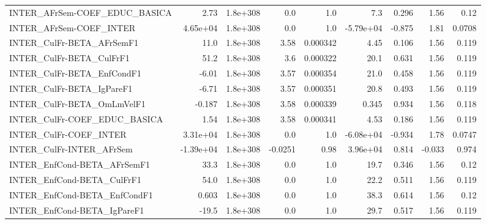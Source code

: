 \begin{tabular}{lrrrrrrrr}
INTER\_AFrSem-COEF\_EDUC\_BASICA         &        2.73 &     1.8e+308 &     0.0 &      1.0 &        7.3 &       0.296 &         1.56 &          0.12 \\
INTER\_AFrSem-COEF\_INTER               &    4.65e+04 &     1.8e+308 &     0.0 &      1.0 &  -5.79e+04 &      -0.875 &         1.81 &        0.0708 \\
INTER\_CulFr-BETA\_AFrSemF1             &        11.0 &     1.8e+308 &    3.58 & 0.000342 &       4.45 &       0.106 &         1.56 &         0.119 \\
INTER\_CulFr-BETA\_CulFrF1              &        51.2 &     1.8e+308 &     3.6 & 0.000322 &       20.1 &       0.631 &         1.56 &         0.119 \\
INTER\_CulFr-BETA\_EnfCondF1            &       -6.01 &     1.8e+308 &    3.57 & 0.000354 &       21.0 &       0.458 &         1.56 &         0.119 \\
INTER\_CulFr-BETA\_IgPareF1             &       -6.71 &     1.8e+308 &    3.57 & 0.000351 &       20.8 &       0.493 &         1.56 &         0.119 \\
INTER\_CulFr-BETA\_OmLmVelF1            &      -0.187 &     1.8e+308 &    3.58 & 0.000339 &      0.345 &       0.934 &         1.56 &         0.118 \\
INTER\_CulFr-COEF\_EDUC\_BASICA          &        1.54 &     1.8e+308 &    3.58 & 0.000341 &       4.53 &       0.186 &         1.56 &         0.119 \\
INTER\_CulFr-COEF\_INTER                &    3.31e+04 &     1.8e+308 &     0.0 &      1.0 &  -6.08e+04 &      -0.934 &         1.78 &        0.0747 \\
INTER\_CulFr-INTER\_AFrSem              &   -1.39e+04 &     1.8e+308 & -0.0251 &     0.98 &   3.96e+04 &       0.814 &       -0.033 &         0.974 \\
INTER\_EnfCond-BETA\_AFrSemF1           &        33.3 &     1.8e+308 &     0.0 &      1.0 &       19.7 &       0.346 &         1.56 &          0.12 \\
INTER\_EnfCond-BETA\_CulFrF1            &        54.0 &     1.8e+308 &     0.0 &      1.0 &       22.2 &       0.511 &         1.56 &         0.119 \\
INTER\_EnfCond-BETA\_EnfCondF1          &       0.603 &     1.8e+308 &     0.0 &      1.0 &       38.3 &       0.614 &         1.56 &          0.12 \\
INTER\_EnfCond-BETA\_IgPareF1           &       -19.5 &     1.8e+308 &     0.0 &      1.0 &       29.7 &       0.517 &         1.56 &         0.119 \\

\end{tabular}
